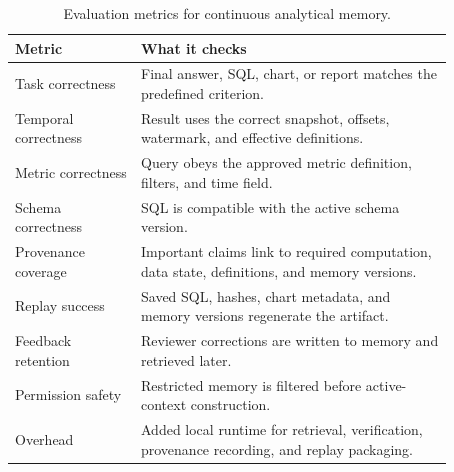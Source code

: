 \documentclass[sigconf,nonacm]{acmart}
\begin{document}
\begin{table}[p]
\centering
\small
\begin{tabular}{L{0.25\linewidth}L{0.62\linewidth}}
\toprule
\textbf{Metric} & \textbf{What it checks} \\
\midrule
Task correctness & Final answer, SQL, chart, or report matches the predefined criterion. \\
Temporal correctness & Result uses the correct snapshot, offsets, watermark, and effective definitions. \\
Metric correctness & Query obeys the approved metric definition, filters, and time field. \\
Schema correctness & SQL is compatible with the active schema version. \\
Provenance coverage & Important claims link to required computation, data state, definitions, and memory versions. \\
Replay success & Saved SQL, hashes, chart metadata, and memory versions regenerate the artifact. \\
Feedback retention & Reviewer corrections are written to memory and retrieved later. \\
Permission safety & Restricted memory is filtered before active-context construction. \\
Overhead & Added local runtime for retrieval, verification, provenance recording, and replay packaging. \\
\bottomrule
\end{tabular}
\caption{Evaluation metrics for continuous analytical memory.}
\label{tab:metrics}
\end{table}
\end{document}
